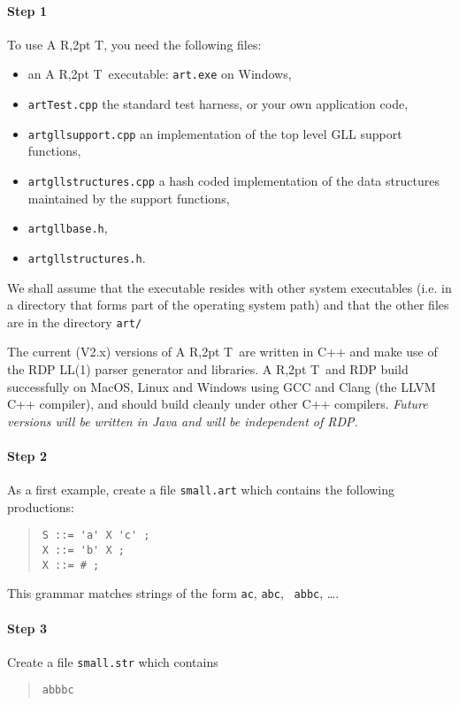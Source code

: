 \documentclass[11pt]{article}
\newcommand{\art}{{\rm A\kern -2pt R\kern -2,2pt T}}
\begin{document}
\paragraph{Step 1}
To use \art, you need the following files:
\begin{itemize}
\item an \art\ executable: {\tt art.exe} on Windows,
\item {\tt artTest.cpp} the standard test harness, or your own application code,
\item {\tt artgllsupport.cpp} an implementation of the top level GLL support functions,
\item {\tt artgllstructures.cpp} a hash coded implementation of the data structures maintained by the support functions,
\item {\tt artgllbase.h},
\item {\tt artgllstructures.h}.
\end{itemize}

We shall assume that the executable resides with other system executables (i.e. in a directory that forms part of the operating system path) and that the other files are in the directory {\tt art/}

The current (V2.x) versions of \art\ are written in C++ and make use of
the RDP LL(1) parser generator and libraries. \art\ and RDP build
successfully on MacOS, Linux and Windows using GCC and Clang (the LLVM
C++ compiler), and should build cleanly under other C++
compilers. {\em Future versions will be written in Java and will be
independent of RDP.}


\paragraph{Step 2}
As a first example, create a file {\tt small.art} which contains the following productions:
\begin{quote}
\begin{verbatim}
S ::= 'a' X 'c' ;
X ::= 'b' X ;
X ::= # ;
\end{verbatim}
\end{quote}

This grammar matches strings of the form {\tt ac}, {\tt abc}, {\tt
  abbc}, \ldots. 
\paragraph{Step 3}
Create a file {\tt small.str} which contains
\begin{quote}
\begin{verbatim}
abbbc
\end{verbatim}
\end{quote}
\end{document}
